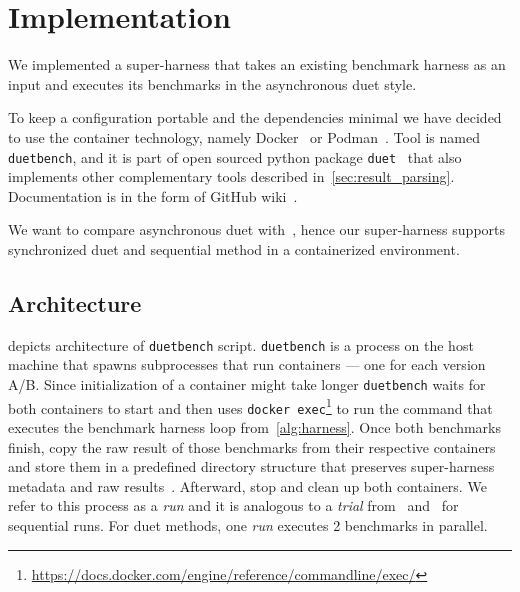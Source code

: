 \chapter{Implementation}
\label{chap:impl}

We implemented a super-harness that takes an existing benchmark harness as an input and executes its benchmarks in the asynchronous duet style.

To keep a configuration portable and the dependencies minimal we have decided to use the container technology, namely Docker~\cite{merkel2014docker} or Podman~\cite{podman}.
Tool is named \lstinline{duetbench}, and it is part of open sourced python package \lstinline{duet}~\cite{duet} that also implements other complementary tools described in~\cref{sec:result_parsing}.
Documentation is in the form of GitHub wiki~\cite{wiki}.

We want to compare asynchronous duet with~\citet{bulej2020duet}, hence our super-harness supports synchronized duet and sequential method in a containerized environment.

\section{Architecture}

 depicts architecture of \lstinline{duetbench} script.
\lstinline{duetbench} is a process on the host machine that spawns subprocesses that run containers --- one for each version A/B.
Since initialization of a container might take longer \lstinline{duetbench} waits for both containers to start and then uses \lstinline{docker exec}\footnote{\url{https://docs.docker.com/engine/reference/commandline/exec/}} to run the command that executes the benchmark harness loop from~\cref{alg:harness}.
Once both benchmarks finish, copy the raw result of those benchmarks from their respective containers and store them in a predefined directory structure that preserves super-harness metadata and raw results~\cite{wiki}.
Afterward, stop and clean up both containers.
We refer to this process as a \emph{run} and it is analogous to a \emph{trial} from~\citet{laaber2019software} and~\citet{abedi2017conducting} for sequential runs.
For duet methods, one \emph{run} executes 2 benchmarks in parallel.

